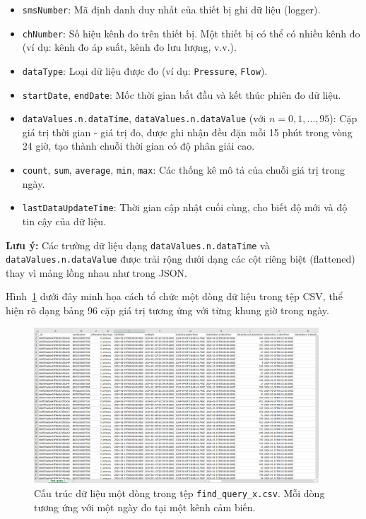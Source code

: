 \begin{itemize}
    \item \texttt{smsNumber}: Mã định danh duy nhất của thiết bị ghi dữ liệu (logger).
    \item \texttt{chNumber}: Số hiệu kênh đo trên thiết bị. Một thiết bị có thể có nhiều kênh đo (ví dụ: kênh đo áp suất, kênh đo lưu lượng, v.v.).
    \item \texttt{dataType}: Loại dữ liệu được đo (ví dụ: \texttt{Pressure}, \texttt{Flow}).
    \item \texttt{startDate}, \texttt{endDate}: Mốc thời gian bắt đầu và kết thúc phiên đo dữ liệu.
    \item \texttt{dataValues.n.dataTime}, \texttt{dataValues.n.dataValue} (với $n = 0,1,\ldots,95$): Cặp giá trị thời gian - giá trị đo, được ghi nhận đều đặn mỗi 15 phút trong vòng 24 giờ, tạo thành chuỗi thời gian có độ phân giải cao.
    \item \texttt{count}, \texttt{sum}, \texttt{average}, \texttt{min}, \texttt{max}: Các thống kê mô tả của chuỗi giá trị trong ngày.
    \item \texttt{lastDataUpdateTime}: Thời gian cập nhật cuối cùng, cho biết độ mới và độ tin cậy của dữ liệu.
\end{itemize}

\noindent
\textbf{Lưu ý:} Các trường dữ liệu dạng \texttt{dataValues.n.dataTime} và \texttt{dataValues.n.dataValue} được trải rộng dưới dạng các cột riêng biệt (flattened) thay vì mảng lồng nhau như trong JSON.

\vspace{1em}
Hình~\ref{fig:sample_data_structure} dưới đây minh họa cách tổ chức một dòng dữ liệu trong tệp CSV, thể hiện rõ dạng bảng 96 cặp giá trị tương ứng với từng khung giờ trong ngày.

\begin{figure}[htbp]
    \centering
    \includegraphics[width=0.95\textwidth]{image/section6_1/sample_data_structure.png}
    \caption{Cấu trúc dữ liệu một dòng trong tệp \texttt{find\_query\_x.csv}. Mỗi dòng tương ứng với một ngày đo tại một kênh cảm biến.}
    \label{fig:sample_data_structure}
\end{figure}

